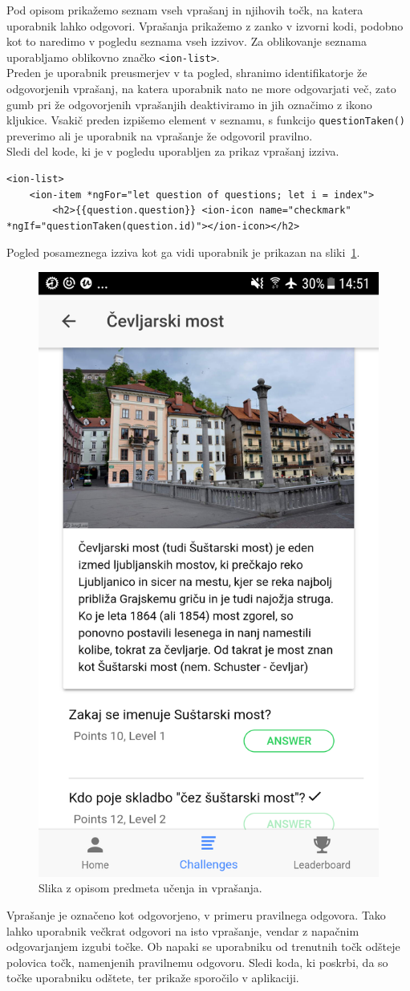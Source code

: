 \documentclass[a4paper, 12pt]{book}
\begin{document}
\noindent Pod opisom prikažemo seznam vseh vprašanj in njihovih točk, na katera uporabnik lahko odgovori. Vprašanja prikažemo z zanko v izvorni kodi, podobno kot to naredimo v pogledu seznama vseh izzivov. Za oblikovanje seznama uporabljamo oblikovno značko \texttt{<ion-list>}.\\Preden je uporabnik preusmerjev v ta pogled, shranimo identifikatorje že odgovorjenih vprašanj, na katera uporabnik nato ne more odgovarjati več, zato gumb pri že odgovorjenih vprašanjih deaktiviramo in jih označimo z ikono kljukice. Vsakič preden izpišemo element v seznamu, s funkcijo \texttt{questionTaken()} preverimo ali je uporabnik na vprašanje že odgovoril pravilno.\\Sledi del kode, ki je v pogledu uporabljen za prikaz vprašanj izziva.
\begin{lstlisting}
<ion-list>
    <ion-item *ngFor="let question of questions; let i = index">
        <h2>{{question.question}} <ion-icon name="checkmark" *ngIf="questionTaken(question.id)"></ion-icon></h2>
\end{lstlisting}
Pogled posameznega izziva kot ga vidi uporabnik je prikazan na sliki~\ref{izziv}.
\begin{figure}[H]
\centering
\includegraphics[height=0.8\textwidth]{slike/izziv}
\caption{Slika z opisom predmeta učenja in vprašanja.}\label{izziv}
\end{figure}
\noindent Vprašanje je označeno kot odgovorjeno, v primeru pravilnega odgovora. Tako lahko uporabnik večkrat odgovori na isto vprašanje, vendar z napačnim odgovarjanjem izgubi točke. Ob napaki se uporabniku od trenutnih točk odšteje polovica točk, namenjenih pravilnemu odgovoru. Sledi koda, ki poskrbi, da so točke uporabniku odštete, ter prikaže sporočilo v aplikaciji. 
\end{document}
